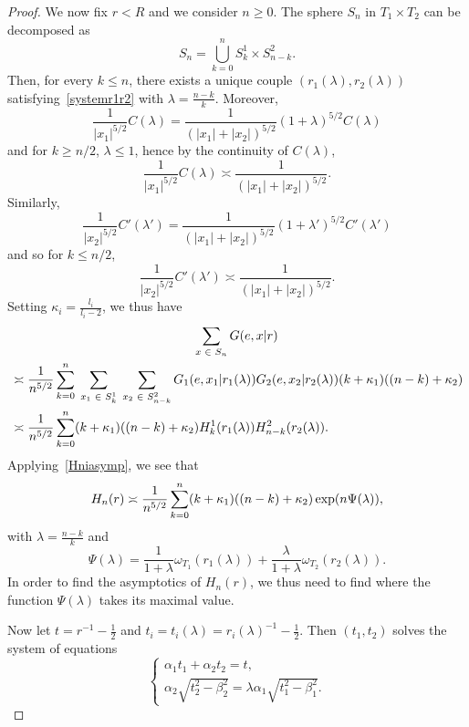 \documentclass[10pt]{amsart}
\theoremstyle{definition}\newtheorem{defi}[theo]{Definition}\newtheorem{rema}[theo]{Remark}\newtheorem{exam}[theo]{Example}\newtheorem{exem}[theo]{Example}\newtheorem{nota}[theo]{Notation}
\let\originalleft\left
\let\originalright\right
\renewcommand{\left}{\mathopen{}\mathclose\bgroup\originalleft}
\renewcommand{\right}{\aftergroup\egroup\originalright}
\let\oldin\in
\renewcommand{\in}{\mathchoice{\oldin}{\oldin}{\,\oldin\,}{\,\oldin\,}}
\begin{document}
\begin{proof}
We now fix $r<R$ and we consider $n\geq0$. The sphere $S_n$ in $T_1\times T_2$ can be decomposed as
\[
S_n=\bigcup_{k=0}^nS_{k}^1\times S_{n-k}^2.
\]
Then, for every $k\leq n$, there exists a unique couple $(r_1(\lambda), r_2(\lambda))$ satisfying~\eqref{systemr1r2} with $\lambda=\frac{n-k}{k}$. Moreover,
\[
\frac{1}{|x_1|^{5/2}}C(\lambda)=\frac{1}{(|x_1|+|x_2|)^{5/2}}(1+\lambda)^{5/2}C(\lambda)
\]
and for $k\geq n/2$, $\lambda \leq 1$, hence by the continuity of $C(\lambda)$,
\[
\frac{1}{|x_1|^{5/2}}C(\lambda)\asymp \frac{1}{(|x_1|+|x_2|)^{5/2}}.
\]
Similarly,
\[
\frac{1}{|x_2|^{5/2}}C'(\lambda')=\frac{1}{(|x_1|+|x_2|)^{5/2}}(1+\lambda')^{5/2}C'(\lambda')
\]
and so for $k\leq n/2$,
\[
\frac{1}{|x_2|^{5/2}}C'(\lambda')\asymp \frac{1}{(|x_1|+|x_2|)^{5/2}}.
\]
Setting $\kappa_i=\frac{l_i}{l_i-2}$, we thus have
\begin{multline*}
\sum_{x\in S_n}G(e,x|r)\\
\begin{aligned}
&\asymp \frac{1}{n^{5/2}}\sum_{k=0}^n \;
\sum_{x_1\in S_k^1}\;\sum_{x_2\in S_{n-k}^2}G_1(e,x_1|r_1(\lambda)) G_2(e,x_2|r_2(\lambda))(k+\kappa_1)((n-k)+\kappa_2)\\
&\asymp \frac{1}{n^{5/2}}\sum_{k=0}^n(k+\kappa_1)((n-k)+\kappa_2) H^1_k(r_1(\lambda)) H^2_{n-k}(r_2(\lambda)).
\end{aligned}
\end{multline*}
Applying~\eqref{Hniasymp}, we see that
\begin{equation}\label{Hnasymp}
H_n(r) \asymp \frac{1}{n^{5/2}} \sum_{k = 0}^n (k+\kappa_1)((n-k)+\kappa_2) \exp \left(n \Psi(\lambda) \right),
\end{equation}
with $\lambda = \frac{n - k}{k}$ and
\[
\Psi(\lambda) = \frac{1}{1 + \lambda} \omega_{T_1}(r_1(\lambda)) + \frac{\lambda}{1 + \lambda} \omega_{T_2}(r_2(\lambda)).
\]
In order to find the asymptotics of $H_n(r)$, we thus need to find where the function $\Psi(\lambda)$ takes its maximal value.


Now let $t = r^{-1} - \frac{1}{2}$ and $t_i = t_i(\lambda) = r_i(\lambda)^{-1} - \frac{1}{2}$. Then $(t_1, t_2)$ solves the system of equations
\begin{equation}\label{systemt1t2}
\begin{cases}
\alpha_1 t_1 + \alpha_2 t_2 = t, \\
\alpha_2 \sqrt{t_2^2 - \beta_2^2} = \lambda \alpha_1 \sqrt{t_1^2 - \beta_1^2}.
\end{cases}
\end{equation}


\end{proof}
\end{document}
